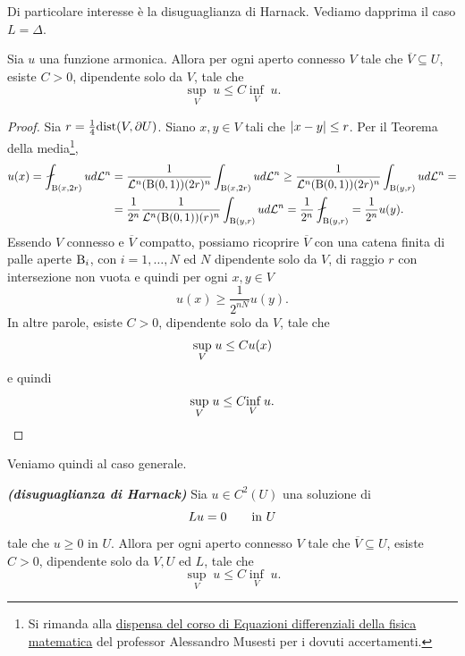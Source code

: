 Di particolare interesse è la disuguaglianza di Harnack. Vediamo dapprima il caso $L = \Delta$.
\begin{proposizione}
	Sia $u$ una funzione armonica. Allora per ogni aperto connesso $V$ tale che $\overline{V} \subseteq U$, esiste $C > 0$, dipendente solo da $V$, tale che 
	\[ \underset{V}{\sup} \; u \le C \underset{V}{\inf} \; u. \]
\end{proposizione}
\begin{proof}
	Sia $r = \frac{1}{4}\textup{dist}(V,\partial U)$. Siano $x,y \in V$ tali che $\lvert x-y\rvert\le r$. Per il Teorema della media\footnote{Si rimanda alla 
		\href{https://www.dmf.unicatt.it/~musesti/EDFM/}{dispensa del corso di Equazioni differenziali della fisica matematica} del professor Alessandro Musesti per i dovuti accertamenti.}, 
	\begin{align*}
		u(x) = \fint_{\textup{B}(x,2r)} ud\mathcal{L}^n &= \frac{1}{\mathcal{L}^n(\textup{B}(0,1))(2r)^n} \int_{\textup{B}(x,2r)}ud\mathcal{L}^n \ge \frac{1}{\mathcal{L}^n(\textup{B}(0,1))(2r)^n} \int_{\textup{B}(y,r)}ud\mathcal{L}^n = \\
		&= \frac{1}{2^n} \frac{1}{\mathcal{L}^n(\textup{B}(0,1))(r)^n} \int_{\textup{B}(y,r)}ud\mathcal{L}^n = \frac{1}{2^n} \fint_{\textup{B}(y,r)} = \frac{1}{2^n} u(y). 
	\end{align*}
	Essendo $V$ connesso e $\overline{V}$ compatto, possiamo ricoprire $\overline{V}$ con una catena finita di palle aperte $\textup{B}_i$, con $i = 1,\dots, N$ ed $N$ dipendente solo da $V$, di raggio $r$ con intersezione non vuota e quindi per ogni $x,y \in V$
	\[ u(x) \ge \frac{1}{2^{nN}} u(y). \]
	In altre parole, esiste $C >0$, dipendente solo da $V$, tale che
	\[ \underset{V}{\textup{sup}}\; u \le Cu(x) \]
	e quindi 
	\[ \underset{V}{\textup{sup}}\; u \le C  \underset{V}{\textup{inf}}\; u.\qedhere\]
\end{proof}
Veniamo quindi al caso generale.
\begin{teorema}\textbf{\emph{(disuguaglianza di Harnack)}}
	Sia $u \in C^2(U)$ una soluzione di 
	\[ Lu = 0 \qquad \textup{in } U \]
	tale che $u\ge 0$ in $U$. Allora per ogni aperto connesso $V$ tale che $\overline{V} \subseteq U$, esiste $C > 0$, dipendente solo da $V,U$ ed $L$, tale che 
	\[ \underset{V}{\sup} \; u \le C \underset{V}{\inf} \; u. \]
\end{teorema}

